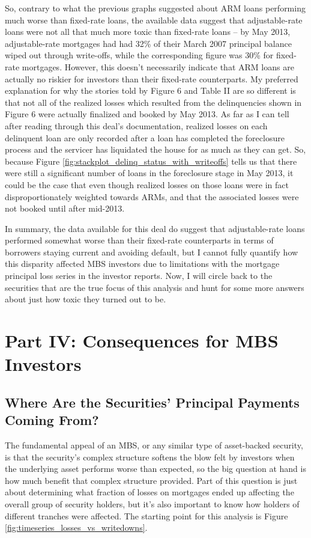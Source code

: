 \documentclass[12pt]{article}
\begin{document}
So, contrary to what the previous graphs suggested about ARM loans performing much worse than fixed-rate loans, the available data suggest that adjustable-rate loans were not all that much more toxic than fixed-rate loans – by May 2013, adjustable-rate mortgages had had 32\% of their March 2007 principal balance wiped out through write-offs, while the corresponding figure was 30\% for fixed-rate mortgages. However, this doesn't necessarily indicate that ARM loans are actually no riskier for investors than their fixed-rate counterparts. My preferred explanation for why the stories told by Figure 6 and Table II are so different is that not all of the realized losses which resulted from the delinquencies shown in Figure 6 were actually finalized and booked by May 2013. As far as I can tell after reading through this deal’s documentation, realized losses on each delinquent loan are only recorded after a loan has completed the foreclosure process and the servicer has liquidated the house for as much as they can get. So, because Figure \ref{fig:stackplot_delinq_status_with_writeoffs} tells us that there were still a significant number of loans in the foreclosure stage in May 2013, it could be the case that even though realized losses on those loans were in fact disproportionately weighted towards ARMs, and that the associated losses were not booked until after mid-2013.

In summary, the data available for this deal do suggest that adjustable-rate loans performed somewhat worse than their fixed-rate counterparts in terms of borrowers staying current and avoiding default, but I cannot fully quantify how this disparity affected MBS investors due to limitations with the mortgage principal loss series in the investor reports. Now, I will circle back to the securities that are the true focus of  this analysis and hunt for some more answers about just how toxic they turned out to be.

\section*{Part IV: Consequences for MBS Investors}

\subsection*{Where Are the Securities' Principal Payments Coming From?}

The fundamental appeal of an MBS, or any similar type of asset-backed security, is that the security’s complex structure softens the blow felt by investors when the underlying asset performs worse than expected, so the big question at hand is how much benefit that complex structure provided. Part of this question is just about determining what fraction of losses on mortgages ended up affecting the overall group of security holders, but it’s also important to know how holders of different tranches were affected. The starting point for this analysis is Figure \ref{fig:timeseries_losses_vs_writedowns}.
\end{document}
